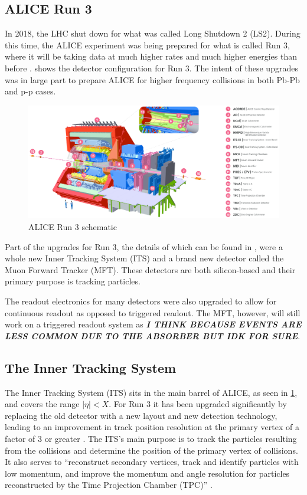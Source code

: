 \documentclass[11pt]{article}
\numberwithin{equation}{section}
\numberwithin{figure}{section}
\numberwithin{table}{section}
\begin{document}
\subsection{ALICE Run 3}
In 2018, the LHC shut down for what was called Long Shutdown 2 (LS2). During this time, the ALICE experiment was being prepared for what is called Run 3, where it will be taking data at much higher rates and much higher energies than before \cite{ALICE_Upgrade_LOI}.  shows the detector configuration for Run 3. The intent of these upgrades was in large part to prepare ALICE for higher frequency collisions in both Pb-Pb and p-p cases. 

\begin{figure}[h]
    \begin{center}
        \includegraphics[width=.8\textwidth]{Figs/ALICE_RUN3_schematic.png}
        \caption{ALICE Run 3 schematic}
        \label{fig:ALICE_Schematic}
    \end{center}
\end{figure}

Part of the upgrades for Run 3, the details of which can be found in \cite{ALICE_Upgrade_LOI}, were a whole new Inner Tracking System (ITS) and a brand new detector called the Muon Forward Tracker (MFT). These detectors are both silicon-based and their primary purpose is tracking particles. 

The readout electronics for many detectors were also upgraded to allow for continuous readout as opposed to triggered readout. The MFT, however, will still work on a triggered readout system as \textit{\textbf{I THINK BECAUSE EVENTS ARE LESS COMMON DUE TO THE ABSORBER BUT IDK FOR SURE}}.

\subsection{The Inner Tracking System}
The Inner Tracking System (ITS) sits in the main barrel of ALICE, as seen in \cref{fig:ALICE_Schematic}, and covers the range $|\eta|<X$. For Run 3 it has been upgraded significantly by replacing the old detector with a new layout and new detection technology, leading to an improvement in track position resolution at the primary vertex of a factor of 3 or greater \cite{ITS_Upgrade_TDR}. The ITS's main purpose is to track the particles resulting from the collisions and determine the position of the primary vertex of collisions. It also serves to ``reconstruct secondary vertices, track and identify particles with low momentum, and improve the momentum and angle resolution for particles reconstructed by the Time Projection Chamber (TPC)'' \cite{ITS_Info}.
\end{document}
